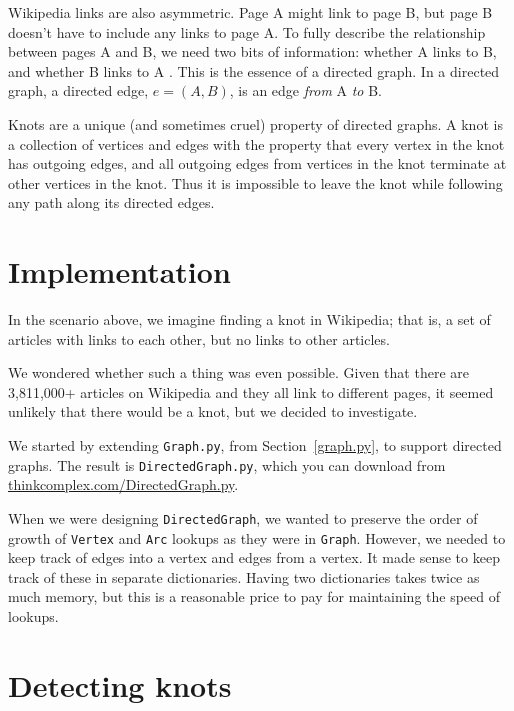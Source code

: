 \documentclass[10pt]{book}
\begin{document}
Wikipedia links are also asymmetric. Page A might link to page B, but
page B doesn't have to include any links to page A. To fully describe
the relationship between pages A and B, we need two bits of
information: whether A links to B, and whether B links to A . This is
the essence of a directed graph. In a directed graph, a directed
edge, $e = (A,B)$, is an edge {\em from} A \emph{to} B.


Knots are a unique (and sometimes cruel)
property of directed graphs. A knot is a
collection of vertices and edges with the property that every vertex
in the knot has outgoing edges, and all outgoing edges from vertices
in the knot terminate at other vertices in the knot. Thus it is
impossible to leave the knot while following any path along its
directed edges.

\section{Implementation}

In the scenario above, we imagine finding a knot in Wikipedia;
that is, a set of articles with links to each other, but no
links to other articles.

We wondered whether such a thing was even possible. Given that there
are 3,811,000+ articles on Wikipedia and they all link to different
pages, it seemed unlikely that there would be a knot, but we decided
to investigate.

We started by extending \verb"Graph.py", from Section~\ref{graph.py}, to
support directed graphs. The result is \verb"DirectedGraph.py", which
you can download from \url{thinkcomplex.com/DirectedGraph.py}.

When we were designing \verb"DirectedGraph", we wanted to preserve the
order of growth of \verb"Vertex" and \verb"Arc" lookups as they were
in \verb"Graph".  However, we needed to keep track of edges into a
vertex and edges from a vertex. It made sense to keep track of these
in separate dictionaries. Having two
dictionaries takes twice as much memory, but this is a
reasonable price to pay for maintaining the speed of lookups.

\section{Detecting knots}
\end{document}
